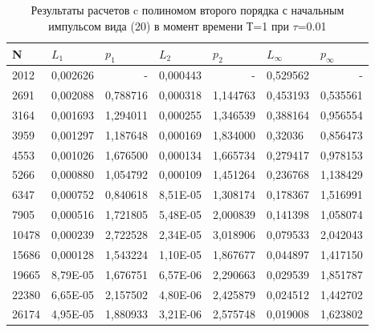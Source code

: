 \documentclass[14pt]{article}
\begin{document}
\begin{table}[!h!]
\caption{Результаты расчетов c полиномом второго порядка с начальным импульсом вида (20) в момент времени Т=1 при $\tau$=0.01}
\begin{tabular}{|l|l|l|l|l|l|l|}
\hline
\multicolumn{1}{|l|}{N} & \multicolumn{1}{l|}{$L_1$}        & \multicolumn{1}{l|}{$p_1$} & \multicolumn{1}{l|}{$L_2$}     & \multicolumn{1}{l|}{$p_2$} & \multicolumn{1}{l|}{$L_\infty$} & \multicolumn{1}{l|}{$p_\infty$} \\ \hline
2012  & 0,002626 & \multicolumn{1}{r|}{-} & 0,000443 & \multicolumn{1}{r|}{-} & 0,529562 & \multicolumn{1}{r|}{-} \\ \hline
2691  & 0,002088 & 0,788716               & 0,000318 & 1,144763 & 0,453193 & 0,535561               \\ \hline
3164  & 0,001693 & 1,294011               & 0,000255 & 1,346539 & 0,388164 & 0,956554               \\ \hline
3959  & 0,001297 & 1,187648               & 0,000169 & 1,834000 & 0,32036  & 0,856473               \\ \hline
4553  & 0,001026 & 1,676500               & 0,000134 & 1,665734 & 0,279417 & 0,978153               \\ \hline
5266  & 0,000880 & 1,054792               & 0,000109 & 1,451264 & 0,236768 & 1,138429               \\ \hline
6347  & 0,000752 & 0,840618               & 8,51E-05 & 1,308174 & 0,178367 & 1,516991               \\ \hline
7905  & 0,000516 & 1,721805               & 5,48E-05 & 2,000839 & 0,141398 & 1,058074               \\ \hline
10478 & 0,000239 & 2,722528               & 2,34E-05 & 3,018906 & 0,079533 & 2,042043               \\ \hline
15686 & 0,000128 & 1,543224               & 1,10E-05 & 1,867677 & 0,044897 & 1,417150               \\ \hline
19665 & 8,79E-05 & 1,676751               & 6,57E-06 & 2,290663 & 0,029539 & 1,851787               \\ \hline
22380 & 6,65E-05 & 2,157502               & 4,80E-06 & 2,425879 & 0,024512 & 1,442702               \\ \hline
26174 & 4,95E-05 & 1,880933               & 3,21E-06 & 2,575748 & 0,019008 & 1,623802               \\ \hline
\end{tabular}

\end{table}
\end{document}
